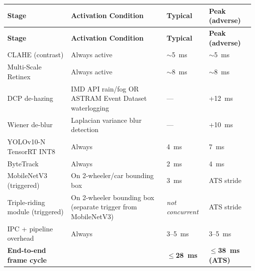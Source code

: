 \documentclass[11pt,a4paper]{article}
\begin{document}
\begin{longtable}{L{4.5cm} L{5cm} C{2.2cm} C{2.5cm}}
    \toprule
    \color{white}\textbf{Stage} & \color{white}\textbf{Activation Condition} & \color{white}\textbf{Typical} & \color{white}\textbf{Peak (adverse)} \\
    \midrule
    \endfirsthead
    \toprule
    \color{white}\textbf{Stage} & \color{white}\textbf{Activation Condition} & \color{white}\textbf{Typical} & \color{white}\textbf{Peak (adverse)} \\
    \midrule
    \endhead
    \bottomrule
    \endfoot

    CLAHE (contrast) & Always active & $\sim$5~ms & $\sim$5~ms \\
    Multi-Scale Retinex & Always active & $\sim$8~ms & $\sim$8~ms \\
    DCP de-hazing & IMD API rain/fog OR ASTRAM Event Dataset waterlogging & --- & +12~ms \\
    Wiener de-blur & Laplacian variance blur detection & --- & +10~ms \\
    YOLOv10-N TensorRT INT8 & Always & 4~ms & 7~ms \\
    ByteTrack & Always & 2~ms & 4~ms \\
    MobileNetV3 (triggered) & On 2-wheeler/car bounding box & 3~ms & ATS stride \\
    Triple-riding module (triggered) & On 2-wheeler bounding box (separate trigger from MobileNetV3) & \textit{not concurrent} & ATS stride \\
    IPC + pipeline overhead & Always & 3--5~ms & 3--5~ms \\
    \midrule
    \textbf{End-to-end frame cycle} & & \textbf{$\leq$28~ms} & \textbf{$\leq$38~ms (ATS)} \\
\end{longtable}
\end{document}
